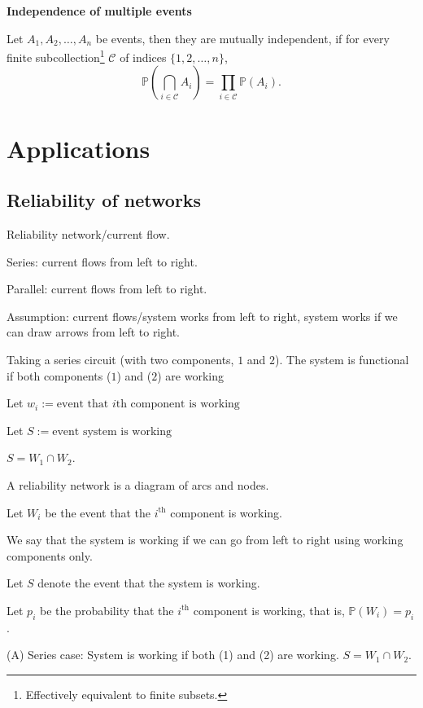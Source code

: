 \documentclass[10pt, a4paper]{article}
\begin{document}
\textbf{Independence of multiple events}
\begin{definition}
    Let $A_1, A_2, \dotsc, A_n$ be events, then they are mutually independent, if for every finite subcollection\footnote{Effectively equivalent to finite subsets.} $\mathcal{C}$ of indices $\{1, 2, \dotsc, n\}$,
    \[
    \mathbb{P}\left(\bigcap_{i \in \mathcal{C}}A_i\right) = \prod_{i \in \mathcal{C}}\mathbb{P}(A_i).
    \]
\end{definition}

\newpage

\section{Applications}

\subsection{Reliability of networks}
Reliability network/current flow.

Series: current flows from left to right. 

Parallel: current flows from left to right.

Assumption: current flows/system works from left to right,
system works if we can draw arrows from left to right.

Taking a series circuit (with two components, $1$ and $2$).
The system is functional if both components ($1$) and ($2$) are working

Let $w_i := \text{event that $i$th component is working}$

Let $S := \text{event system is working}$

$S = W_1 \cap W_2$.

\begin{definition}
    A reliability network is a diagram of arcs and nodes.
\end{definition}

Let $W_i$ be the event that the $i^{\text{th}}$ component is working.

We say that the system is working if we can go from left to right using working components only.

Let $S$ denote the event that the system is working.

Let $p_i$ be the probability that the $i^{\text{th}}$ component is working,
that is,
$\mathbb{P}(W_i) = p_i$.

(A) Series case:
System is working if both (1) and (2) are working.
$S = W_1 \cap W_2$. \\
\end{document}
